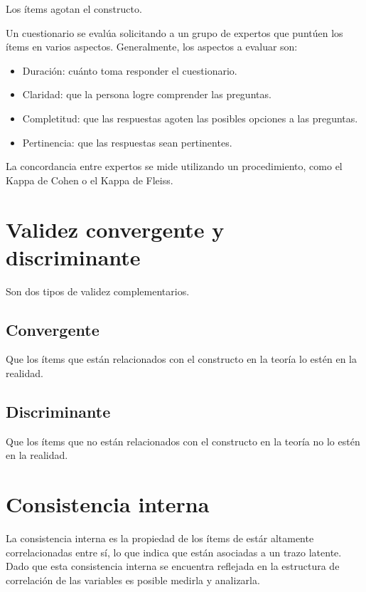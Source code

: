 \documentclass[
  letterpaper,
  DIV=11,
  numbers=noendperiod]{scrreprt}
\providecommand{\tightlist}{%
  \setlength{\itemsep}{0pt}\setlength{\parskip}{0pt}}\usepackage{longtable,booktabs,array}
\begin{document}
Los ítems agotan el constructo.

Un cuestionario se evalúa solicitando a un grupo de expertos que puntúen
los ítems en varios aspectos. Generalmente, los aspectos a evaluar son:

\begin{itemize}
\tightlist
\item
  Duración: cuánto toma responder el cuestionario.
\item
  Claridad: que la persona logre comprender las preguntas.
\item
  Completitud: que las respuestas agoten las posibles opciones a las
  preguntas.
\item
  Pertinencia: que las respuestas sean pertinentes.
\end{itemize}

La concordancia entre expertos se mide utilizando un procedimiento, como
el Kappa de Cohen o el Kappa de Fleiss.

\section{Validez convergente y
discriminante}\label{validez-convergente-y-discriminante}

Son dos tipos de validez complementarios.

\subsection{Convergente}\label{convergente}

Que los ítems que están relacionados con el constructo en la teoría lo
estén en la realidad.

\subsection{Discriminante}\label{discriminante}

Que los ítems que no están relacionados con el constructo en la teoría
no lo estén en la realidad.

\section{Consistencia interna}\label{consistencia-interna}

La consistencia interna es la propiedad de los ítems de estár altamente
correlacionadas entre sí, lo que indica que están asociadas a un trazo
latente. Dado que esta consistencia interna se encuentra reflejada en la
estructura de correlación de las variables es posible medirla y
analizarla.
\end{document}

